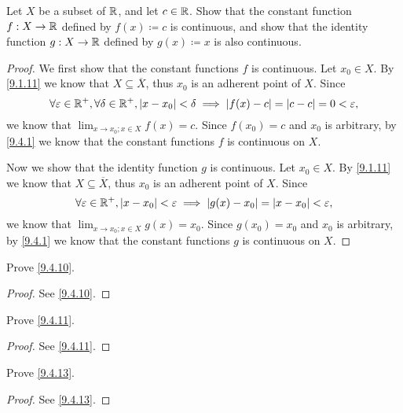 \begin{ex}\label{ex:9.4.2}
  Let \(X\) be a subset of \(\mathbb{R}\), and let \(c \in \mathbb{R}\).
  Show that the constant function \(f : X \to \mathbb{R}\) defined by \(f(x) \coloneqq c\) is continuous, and show that the identity function \(g : X \to \mathbb{R}\) defined by \(g(x) \coloneqq x\) is also continuous.
\end{ex}

\begin{proof}
  We first show that the constant functions \(f\) is continuous.
  Let \(x_0 \in X\).
  By \cref{9.1.11} we know that \(X \subseteq \overline{X}\), thus \(x_0\) is an adherent point of \(X\).
  Since
  \[
    \forall \varepsilon \in \mathbb{R}^+, \forall \delta \in \mathbb{R}^+, \left\lvert x - x_0\right\rvert < \delta \implies \left\lvert f(x) - c\right\rvert = \left\lvert c - c\right\rvert = 0 < \varepsilon,
  \]
  we know that \(\lim_{x \to x_0 ; x \in X} f(x) = c\).
  Since \(f(x_0) = c\) and \(x_0\) is arbitrary, by \cref{9.4.1} we know that the constant functions \(f\) is continuous on \(X\).

  Now we show that the identity function \(g\) is continuous.
  Let \(x_0 \in X\).
  By \cref{9.1.11} we know that \(X \subseteq \overline{X}\), thus \(x_0\) is an adherent point of \(X\).
  Since
  \[
    \forall \varepsilon \in \mathbb{R}^+, \left\lvert x - x_0\right\rvert < \varepsilon \implies \left\lvert g(x) - x_0\right\rvert = \left\lvert x - x_0\right\rvert < \varepsilon,
  \]
  we know that \(\lim_{x \to x_0 ; x \in X} g(x) = x_0\).
  Since \(g(x_0) = x_0\) and \(x_0\) is arbitrary, by \cref{9.4.1} we know that the constant functions \(g\) is continuous on \(X\).
\end{proof}

\begin{ex}\label{ex:9.4.3}
  Prove \cref{9.4.10}.
\end{ex}

\begin{proof}
  See \cref{9.4.10}.
\end{proof}

\begin{ex}\label{ex:9.4.4}
  Prove \cref{9.4.11}.
\end{ex}

\begin{proof}
  See \cref{9.4.11}.
\end{proof}

\begin{ex}\label{ex:9.4.5}
  Prove \cref{9.4.13}.
\end{ex}

\begin{proof}
  See \cref{9.4.13}.
\end{proof}

